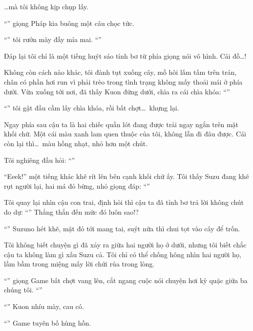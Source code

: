 \documentclass[../main.tex]{subfiles}
\begin{document}
\dots mà tôi không kịp chụp lấy.

``'' giọng Pháp kia buông một câu chọc tức.

``'' tôi rướn mày đầy mỉa mai. ``''

Đáp lại tôi chỉ là một tiếng huýt sáo tỉnh bơ từ phía giọng nói vô hình. Cái đồ\dots!

Không còn cách nào khác, tôi đành tụt xuống cây, mồ hôi lấm tấm trên trán, chân có phần hơi run vì phải trèo trong tình trạng không mấy thoải mái ở phía dưới. Vừa xuống tới nơi, đã thấy Kuon đứng dưới, chìa ra cái chìa khóa: ``''

``'' tôi gật đầu cầm lấy chìa khóa, rồi bất chợt\dots\ khựng lại.

Ngay phía sau cậu ta là hai chiếc quần lót đang được trải ngay ngắn trên mặt khối chữ. Một cái màu xanh lam quen thuộc của tôi, không lẫn đi đâu được. Cái còn lại thì\dots\ màu hồng nhạt, nhỏ hơn một chút.

Tôi nghiêng đầu hỏi: ``''

``Eeek!'' một tiếng khác khẽ rít lên bên cạnh khối chữ ấy. Tôi thấy Suzu đang khẽ rụt người lại, hai má đỏ bừng, nhỏ giọng đáp: ``''

Tôi quay lại nhìn cậu con trai, định hỏi thì cậu ta đã tỉnh bơ trả lời không chút do dự: ``'' Thẳng thắn đến mức đó luôn sao!?

``'' Suzuno hét khẽ, mặt đỏ tới mang tai, suýt nữa thì chui tọt vào cây để trốn.

Tôi không biết chuyện gì đã xảy ra giữa hai người họ ở dưới, nhưng tôi biết chắc cậu ta không làm gì xấu Suzu cả. Tôi chỉ có thể chống hông nhìn hai người họ, lầm bầm trong miệng mấy lời chửi rủa trong lòng.

``'' giọng Game bất chợt vang lên, cắt ngang cuộc nói chuyện hơi kỳ quặc giữa ba chúng tôi. ``''

``'' Kuon nhíu mày, cau có.

``'' Game tuyên bố hùng hồn.
\end{document}
